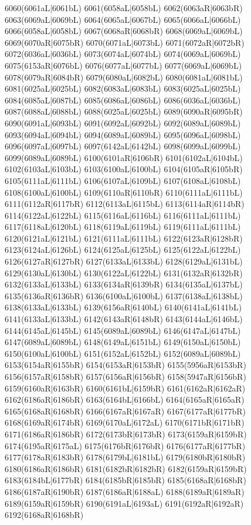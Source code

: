 6060(6061aL|6061bL) 6061(6058aL|6058bL) 6062(6063aR|6063bR) 6063(6069aL|6069bL) 6064(6065aL|6067bL) 6065(6066aL|6066bL) \\6066(6058aL|6058bL) 6067(6068aR|6068bR) 6068(6069aL|6069bL) 6069(6070aR|6075bR) 6070(6071aL|6073bL) 6071(6072aR|6072bR) 6072(6036aL|6036bL) 6073(6074aL|6074bL) 6074(6069aL|6069bL) \\6075(6153aR|6076bL) 6076(6077aL|6077bL) 6077(6069aL|6069bL) 6078(6079aR|6084bR) 6079(6080aL|6082bL) 6080(6081aL|6081bL) 6081(6025aL|6025bL) 6082(6083aL|6083bL) 6083(6025aL|6025bL) \\6084(6085aL|6087bL) 6085(6086aL|6086bL) 6086(6036aL|6036bL) 6087(6088aL|6088bL) 6088(6025aL|6025bL) 6089(6090aR|6095bR) 6090(6091aL|6093bL) 6091(6092aL|6092bL) 6092(6089aL|6089bL) \\6093(6094aL|6094bL) 6094(6089aL|6089bL) 6095(6096aL|6098bL) 6096(6097aL|6097bL) 6097(6142aL|6142bL) 6098(6099aL|6099bL) 6099(6089aL|6089bL) 6100(6101aR|6106bR) 6101(6102aL|6104bL) \\6102(6103aL|6103bL) 6103(6100aL|6100bL) 6104(6105aR|6105bR) 6105(6111aL|6111bL) 6106(6107aL|6109bL) 6107(6108aL|6108bL) 6108(6100aL|6100bL) 6109(6110aR|6110bR) 6110(6111aL|6111bL) \\6111(6112aR|6117bR) 6112(6113aL|6115bL) 6113(6114aR|6114bR) 6114(6122aL|6122bL) 6115(6116aL|6116bL) 6116(6111aL|6111bL) 6117(6118aL|6120bL) 6118(6119aL|6119bL) 6119(6111aL|6111bL) \\6120(6121aL|6121bL) 6121(6111aL|6111bL) 6122(6123aR|6128bR) 6123(6124aL|6126bL) 6124(6125aL|6125bL) 6125(6122aL|6122bL) 6126(6127aR|6127bR) 6127(6133aL|6133bL) 6128(6129aL|6131bL) \\6129(6130aL|6130bL) 6130(6122aL|6122bL) 6131(6132aR|6132bR) 6132(6133aL|6133bL) 6133(6134aR|6139bR) 6134(6135aL|6137bL) 6135(6136aR|6136bR) 6136(6100aL|6100bL) 6137(6138aL|6138bL) \\6138(6133aL|6133bL) 6139(6156aR|6140bL) 6140(6141aL|6141bL) 6141(6133aL|6133bL) 6142(6143aR|6148bR) 6143(6144aL|6146bL) 6144(6145aL|6145bL) 6145(6089aL|6089bL) 6146(6147aL|6147bL) \\6147(6089aL|6089bL) 6148(6149aL|6151bL) 6149(6150aL|6150bL) 6150(6100aL|6100bL) 6151(6152aL|6152bL) 6152(6089aL|6089bL) 6153(6154aR|6155bR) 6154(6153aR|6153bR) 6155(5956aR|6153bR) \\6156(6157aR|6158bR) 6157(6156aR|6156bR) 6158(5947aR|6156bR) 6159(6160aR|6163bR) 6160(6161bL|6159bR) 6161(6162aR|6162aR) 6162(6186aR|6186bR) 6163(6164bL|6166bL) 6164(6165aR|6165aR) \\6165(6168aR|6168bR) 6166(6167aR|6167aR) 6167(6177aR|6177bR) 6168(6169aR|6174bR) 6169(6170aL|6172aL) 6170(6171bR|6171bR) 6171(6186aR|6186bR) 6172(6173bR|6173bR) 6173(6159aR|6159bR) \\6174(6195aR|6175aL) 6175(6176bR|6176bR) 6176(6177aR|6177bR) 6177(6178aR|6183bR) 6178(6179bL|6181bL) 6179(6180bR|6180bR) 6180(6186aR|6186bR) 6181(6182bR|6182bR) 6182(6159aR|6159bR) \\6183(6184bL|6177bR) 6184(6185bR|6185bR) 6185(6168aR|6168bR) 6186(6187aR|6190bR) 6187(6186aR|6188aL) 6188(6189aR|6189aR) 6189(6159aR|6159bR) 6190(6191aL|6193aL) 6191(6192aR|6192aR) \\6192(6168aR|6168bR) 